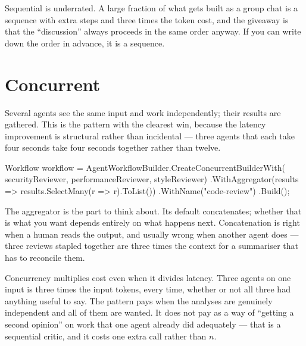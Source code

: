 \begin{note}
Sequential is underrated. A large fraction of what gets built as a group chat is
a sequence with extra steps and three times the token cost, and the giveaway is
that the ``discussion'' always proceeds in the same order anyway. If you can
write down the order in advance, it is a sequence.
\end{note}

\section{Concurrent}
\label{sec:orch-concurrent}

Several agents see the same input and work independently; their results are
gathered. This is the pattern with the clearest win, because the latency
improvement is structural rather than incidental --- three agents that each take
four seconds take four seconds together rather than twelve.

\begin{csharp}[caption={Independent analyses, joined}, label={lst:orch-concurrent}]
Workflow workflow = AgentWorkflowBuilder.CreateConcurrentBuilderWith(
        securityReviewer, performanceReviewer, styleReviewer)
    .WithAggregator(results => results.SelectMany(r => r).ToList())
    .WithName("code-review")
    .Build();
\end{csharp}

The aggregator is the part to think about. Its default concatenates; whether that
is what you want depends entirely on what happens next. Concatenation is right
when a human reads the output, and usually wrong when another agent does --- three
reviews stapled together are three times the context for a summariser that has to
reconcile them.

\begin{warning}
Concurrency multiplies cost even when it divides latency. Three agents on one
input is three times the input tokens, every time, whether or not all three had
anything useful to say. The pattern pays when the analyses are genuinely
independent and all of them are wanted. It does not pay as a way of ``getting a
second opinion'' on work that one agent already did adequately --- that is a
sequential critic, and it costs one extra call rather than $n$.
\end{warning}

